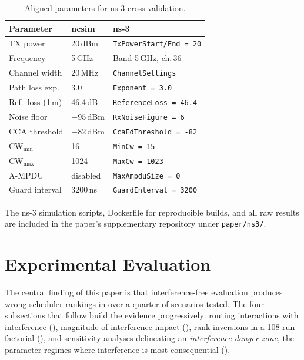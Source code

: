 \documentclass[conference]{IEEEtran}
\begin{document}
\begin{table}[t]
\centering
\caption{Aligned parameters for ns-3 cross-validation.}
\label{tab:ns3_params}
\begin{tabular}{@{}lll@{}}
\toprule
\textbf{Parameter} & \textbf{ncsim} & \textbf{ns-3} \\
\midrule
TX power & 20\,dBm & \texttt{TxPowerStart/End = 20} \\
Frequency & 5\,GHz & Band 5\,GHz, ch.\,36 \\
Channel width & 20\,MHz & \texttt{ChannelSettings} \\
Path loss exp. & 3.0 & \texttt{Exponent = 3.0} \\
Ref.\ loss (1\,m) & 46.4\,dB & \texttt{ReferenceLoss = 46.4} \\
Noise floor & $-95$\,dBm & \texttt{RxNoiseFigure = 6} \\
CCA threshold & $-82$\,dBm & \texttt{CcaEdThreshold = -82} \\
CW$_{\min}$ & 16 & \texttt{MinCw = 15} \\
CW$_{\max}$ & 1024 & \texttt{MaxCw = 1023} \\
A-MPDU & disabled & \texttt{MaxAmpduSize = 0} \\
Guard interval & 3200\,ns & \texttt{GuardInterval = 3200} \\
\bottomrule
\end{tabular}
\end{table}

The ns-3 simulation scripts, Dockerfile for reproducible builds, and all
raw results are included in the paper's supplementary repository under
\texttt{paper/ns3/}.


\section{Experimental Evaluation}
\label{sec:eval}

The central finding of this paper is that interference-free evaluation
produces wrong scheduler rankings in over a quarter of scenarios tested.
The four subsections that follow build the evidence progressively:
routing interactions with interference (),
magnitude of interference impact (),
rank inversions in a 108-run factorial (),
and sensitivity analyses delineating an \emph{interference danger
zone}, the parameter regimes where interference is most consequential
().
\end{document}
